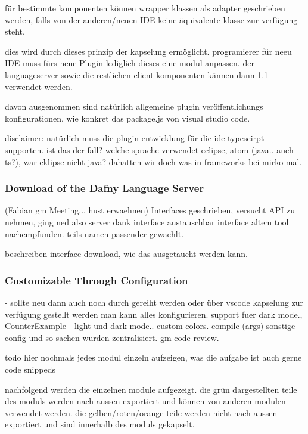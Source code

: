 für bestimmte komponenten können wrapper klassen als adapter geschrieben werden, falls von
der anderen/neuen IDE keine äquivalente klasse zur verfügung steht.

dies  wird durch dieses prinzip der kapselung ermöglicht.
programierer für neeu IDE muss fürs neue Plugin lediglich dieses eine modul anpassen.
der languageserver sowie die restlichen client komponenten kännen dann 1.1 verwendet werden.

davon ausgenommen sind natürlich allgemeine plugin veröffentlichungs konfigurationen, wie konkret
das package.js von visual studio code.

disclaimer: natürlich muss die plugin entwicklung für die ide typescirpt supporten.
ist das der fall? welche sprache verwendet eclipse, atom (java.. auch ts?),
war eklipse nicht java? dahatten wir doch was in frameworks bei mirko mal.

\subsubsection{Download of the Dafny Language Server}
\label{section:implementation:client:download}
  (Fabian gm Meeting... hust erwaehnen)
Interfaces geschrieben, versucht API zu nehmen, ging ned also server
dank interface austauschbar
interface altem tool nachempfunden. teils namen passender gewaehlt.

beschreiben interface download, wie das ausgetaucht werden kann.

\subsubsection{Customizable Through Configuration}
  - sollte neu dann auch noch durch gereiht werden oder über vscode kapselung zur verfügung gestellt werden
man kann alles konfigurieren. support fuer dark mode.,
CounterExample  - light und dark mode.. custom colors.
compile (args)
sonstige config und so sachen wurden zentralisiert. gm code review.



todo hier nochmals jedes modul einzeln aufzeigen, was die aufgabe ist
auch gerne code snippeds

nachfolgend werden die einzelnen module aufgezeigt.
die grün dargestellten teile des moduls werden nach aussen exportiert und können von anderen modulen verwendet werden.
die gelben/roten/orange teile werden nicht nach aussen exportiert und sind innerhalb des moduls gekapselt.

